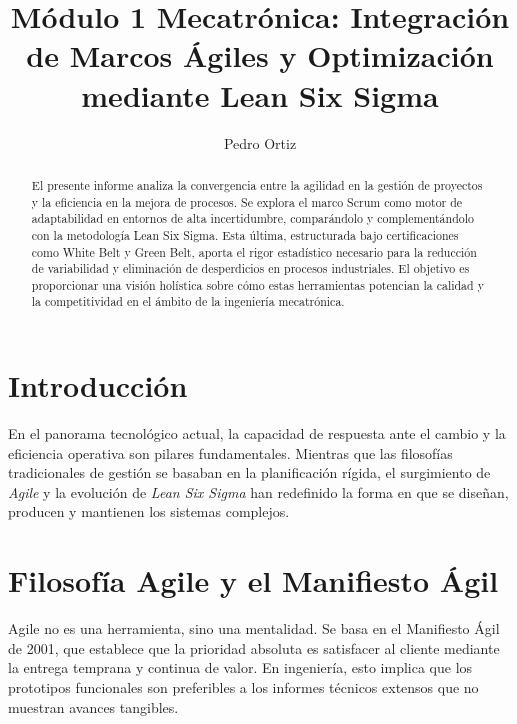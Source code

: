 \documentclass[runningheads]{llncs}
\begin{document}
\title{Módulo 1 Mecatrónica: Integración de Marcos Ágiles y Optimización mediante Lean Six Sigma}

\author{Pedro Ortiz\orcidID{ }}



\maketitle

\begin{abstract}
El presente informe analiza la convergencia entre la agilidad en la gestión de proyectos y la eficiencia en la mejora de procesos. Se explora el marco Scrum como motor de adaptabilidad en entornos de alta incertidumbre, comparándolo y complementándolo con la metodología Lean Six Sigma. Esta última, estructurada bajo certificaciones como White Belt y Green Belt, aporta el rigor estadístico necesario para la reducción de variabilidad y eliminación de desperdicios en procesos industriales. El objetivo es proporcionar una visión holística sobre cómo estas herramientas potencian la calidad y la competitividad en el ámbito de la ingeniería mecatrónica.

\end{abstract}

\section{Introducción}
En el panorama tecnológico actual, la capacidad de respuesta ante el cambio y la eficiencia operativa son pilares fundamentales. Mientras que las filosofías tradicionales de gestión se basaban en la planificación rígida, el surgimiento de \textit{Agile} y la evolución de \textit{Lean Six Sigma} han redefinido la forma en que se diseñan, producen y mantienen los sistemas complejos.

\section{Filosofía Agile y el Manifiesto Ágil}
Agile no es una herramienta, sino una mentalidad. Se basa en el Manifiesto Ágil de 2001, que establece que la prioridad absoluta es satisfacer al cliente mediante la entrega temprana y continua de valor. En ingeniería, esto implica que los prototipos funcionales son preferibles a los informes técnicos extensos que no muestran avances tangibles.
\end{document}
